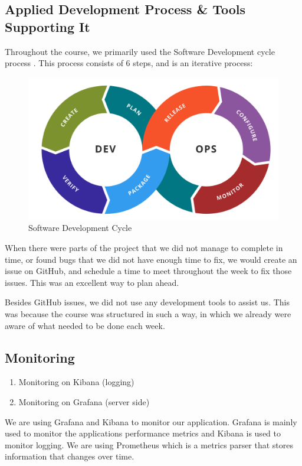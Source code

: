 \documentclass{article}
\begin{document}
\subsection{Applied Development Process \& Tools Supporting It}
Throughout the course, we primarily used the Software Development cycle process \cite{sdc}. This process consists of 6 steps, and is an iterative process:
\begin{figure}[H]
    \centering
    \includegraphics[scale=0.20]{images/sdc.png}
    \caption{Software Development Cycle}
\end{figure}
When there were parts of the project that we did not manage to complete in time, or found bugs that we did not have enough time to fix, we would create an issue on GitHub, and schedule a time to meet throughout the week to fix those issues. This was an excellent way to plan ahead.

Besides GitHub issues, we did not use any development tools to assist us. This was because the course was structured in such a way, in which we already were aware of what needed to be done each week.

\subsection{Monitoring}
\begin{enumerate}
    \item  Monitoring on Kibana (logging)
    \item  Monitoring on Grafana (server side)
\end{enumerate}
We are using Grafana and Kibana to monitor our application. Grafana is mainly used to monitor the applications performance metrics and Kibana is used to monitor logging. 
We are using Prometheus which is a metrics parser that stores information that changes over time.\\
\end{document}
